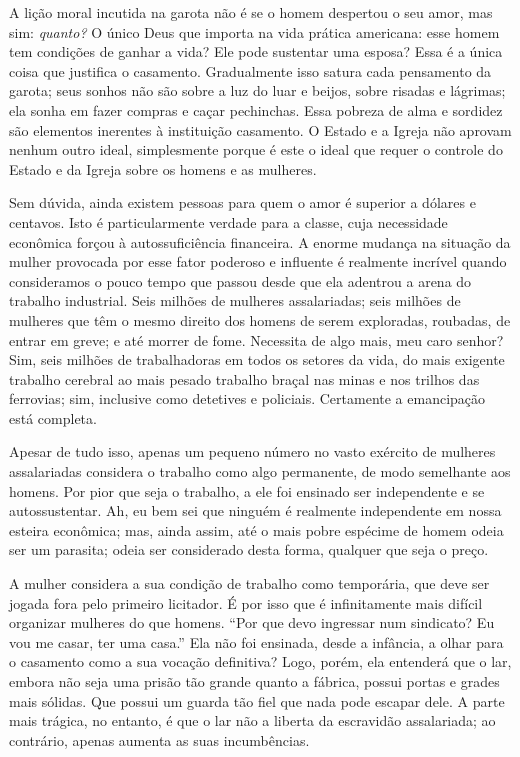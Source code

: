 A lição moral incutida na garota não é se o homem despertou o seu amor,
mas sim: \textit{quanto?} O único Deus que importa na vida prática americana:
esse homem tem condições de ganhar a vida? Ele pode sustentar uma
esposa? Essa é a única coisa que justifica o casamento. Gradualmente
isso satura cada pensamento da garota; seus sonhos não são sobre a luz
do luar e beijos, sobre risadas e lágrimas; ela sonha em fazer compras e
caçar pechinchas. Essa pobreza de alma e sordidez são elementos
inerentes à instituição casamento. O Estado e a Igreja não aprovam
nenhum outro ideal, simplesmente porque é este o ideal que requer o
controle do Estado e da Igreja sobre os homens e as mulheres.

Sem dúvida, ainda existem pessoas para quem o amor é superior a dólares
e centavos. Isto é particularmente verdade para a classe, cuja
necessidade econômica forçou à autossuficiência financeira. A enorme
mudança na situação da mulher provocada por esse fator poderoso e
influente é realmente incrível quando consideramos o pouco tempo que
passou desde que ela adentrou a arena do trabalho industrial. Seis
milhões de mulheres assalariadas; seis milhões de mulheres que têm o
mesmo direito dos homens de serem exploradas, roubadas, de entrar em
greve; e até morrer de fome. Necessita de algo mais, meu caro senhor?
Sim, seis milhões de trabalhadoras em todos os setores da vida, do mais
exigente trabalho cerebral ao mais pesado trabalho braçal nas minas e
nos trilhos das ferrovias; sim, inclusive como detetives e policiais.
Certamente a emancipação está completa.

Apesar de tudo isso, apenas um pequeno número no vasto exército de
mulheres assalariadas considera o trabalho como algo permanente, de modo
semelhante aos homens. Por pior que seja o trabalho, a ele foi ensinado
ser independente e se autossustentar. Ah, eu bem sei que ninguém é
realmente independente em nossa esteira econômica; mas, ainda assim, até
o mais pobre espécime de homem odeia ser um parasita; odeia ser
considerado desta forma, qualquer que seja o preço.

A mulher considera a sua condição de trabalho como temporária, que deve
ser jogada fora pelo primeiro licitador. É por isso que é infinitamente
mais difícil organizar mulheres do que homens. ``Por que devo ingressar
num sindicato? Eu vou me casar, ter uma casa.'' Ela não foi ensinada,
desde a infância, a olhar para o casamento como a sua vocação definitiva?
Logo, porém, ela entenderá que o lar, embora não seja uma prisão tão
grande quanto a fábrica, possui portas e grades mais sólidas. Que possui
um guarda tão fiel que nada pode escapar dele. A parte mais trágica, no entanto, é que o lar não a liberta da escravidão assalariada; ao contrário, apenas aumenta as suas incumbências. 

